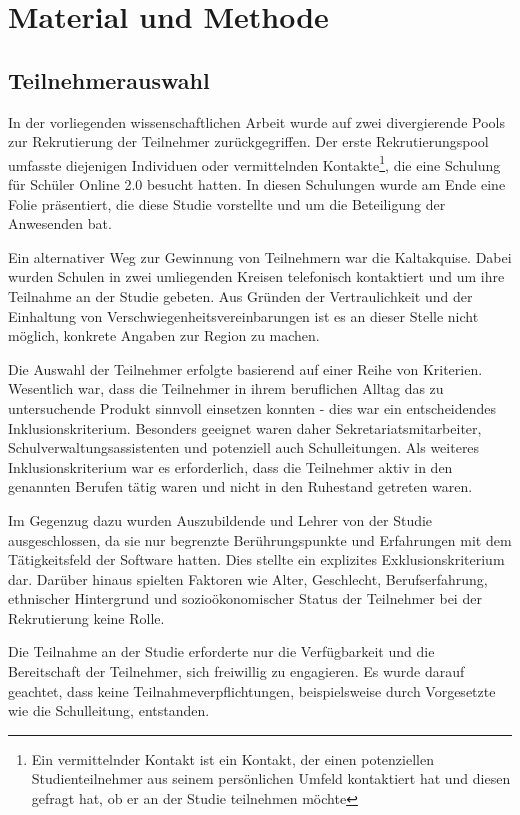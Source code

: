 \newpage
\section{Material und Methode}
\subsection{Teilnehmerauswahl}

In der vorliegenden wissenschaftlichen Arbeit wurde auf zwei divergierende Pools zur Rekrutierung der Teilnehmer zurückgegriffen. Der erste Rekrutierungspool umfasste diejenigen Individuen oder vermittelnden Kontakte\footnote{Ein vermittelnder Kontakt ist ein Kontakt, der einen potenziellen Studienteilnehmer aus seinem persönlichen Umfeld kontaktiert hat und diesen gefragt hat, ob er an der Studie teilnehmen möchte}, die eine Schulung für \glqq Schüler Online 2.0\grqq{} besucht hatten. In diesen Schulungen wurde am Ende eine Folie präsentiert, die diese Studie vorstellte und um die Beteiligung der Anwesenden bat.

Ein alternativer Weg zur Gewinnung von Teilnehmern war die Kaltakquise. Dabei wurden Schulen in zwei umliegenden Kreisen telefonisch kontaktiert und um ihre Teilnahme an der Studie gebeten. Aus Gründen der Vertraulichkeit und der Einhaltung von Verschwiegenheitsvereinbarungen ist es an dieser Stelle nicht möglich, konkrete Angaben zur Region zu machen.

Die Auswahl der Teilnehmer erfolgte basierend auf einer Reihe von Kriterien. Wesentlich war, dass die Teilnehmer in ihrem beruflichen Alltag das zu untersuchende Produkt sinnvoll einsetzen konnten - dies war ein entscheidendes Inklusionskriterium. Besonders geeignet waren daher Sekretariatsmitarbeiter, Schulverwaltungsassistenten und potenziell auch Schulleitungen. Als weiteres Inklusionskriterium war es erforderlich, dass die Teilnehmer aktiv in den genannten Berufen tätig waren und nicht in den Ruhestand getreten waren.

Im Gegenzug dazu wurden Auszubildende und Lehrer von der Studie ausgeschlossen, da sie nur begrenzte Berührungspunkte und Erfahrungen mit dem Tätigkeitsfeld der Software hatten. Dies stellte ein explizites Exklusionskriterium dar. Darüber hinaus spielten Faktoren wie Alter, Geschlecht, Berufserfahrung, ethnischer Hintergrund und sozioökonomischer Status der Teilnehmer bei der Rekrutierung keine Rolle.

Die Teilnahme an der Studie erforderte nur die Verfügbarkeit und die Bereitschaft der Teilnehmer, sich freiwillig zu engagieren. Es wurde darauf geachtet, dass keine Teilnahmeverpflichtungen, beispielsweise durch Vorgesetzte wie die Schulleitung, entstanden.

